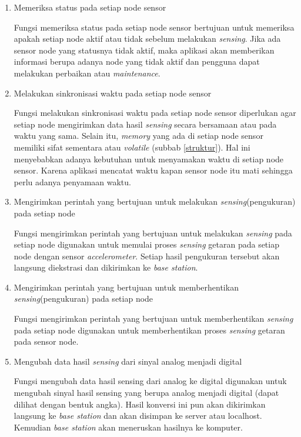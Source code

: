 \begin{enumerate}
	\item Memeriksa status pada setiap node sensor
	
	Fungsi memeriksa status pada setiap node sensor bertujuan untuk memeriksa apakah setiap node aktif atau tidak sebelum melakukan \textit{sensing}. Jika ada sensor node yang statusnya tidak aktif, maka aplikasi akan memberikan informasi berupa adanya node yang tidak aktif dan pengguna dapat melakukan perbaikan atau \textit{maintenance}.
	 
	\item Melakukan sinkronisasi waktu pada setiap node sensor
	
	Fungsi melakukan sinkronisasi waktu pada setiap node sensor diperlukan agar setiap node mengirimkan data hasil \textit{sensing} secara bersamaan atau pada waktu yang sama. Selain itu, \textit{memory} yang ada di setiap node sensor memiliki sifat sementara atau \textit{volatile} (subbab \ref{struktur}). Hal ini menyebabkan adanya kebutuhan untuk menyamakan waktu di setiap node sensor. Karena aplikasi mencatat waktu kapan sensor node itu mati sehingga perlu adanya penyamaan waktu.
	
	\item Mengirimkan perintah yang bertujuan untuk melakukan \textit{sensing}(pengukuran) pada setiap node
	
	Fungsi mengirimkan perintah yang bertujuan untuk melakukan \textit{sensing} pada setiap node digunakan untuk memulai proses \textit{sensing} getaran pada setiap node dengan sensor \textit{accelerometer}. Setiap hasil pengukuran tersebut akan langsung diekstrasi dan dikirimkan ke \textit{base station}.

	
	\item Mengirimkan perintah yang bertujuan untuk memberhentikan \textit{sensing}(pengukuran) pada setiap node
	
	Fungsi mengirimkan perintah yang bertujuan untuk memberhentikan \textit{sensing} pada setiap node digunakan untuk memberhentikan proses \textit{sensing} getaran pada sensor node.
	
	\item Mengubah data hasil \textit{sensing} dari sinyal analog menjadi digital
	
	Fungsi mengubah data hasil sensing dari analog ke digital digunakan untuk mengubah sinyal hasil sensing yang berupa analog menjadi digital (dapat dilihat dengan bentuk angka). Hasil konversi ini pun akan dikirimkan langsung ke \textit{base station} dan akan disimpan ke server atau localhost. Kemudian \textit{base station} akan meneruskan hasilnya ke komputer.
	

\end{enumerate}
